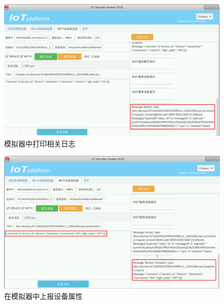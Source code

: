 \begin{figure}[!htbp]
\centering
\includegraphics[width=\textwidth]{figures/序列 01.00_25_35_10.Still025.png}
\caption{模拟器中打印相关日志}\label{模拟器中打印相关日志1}
\end{figure}

\begin{figure}[!htbp]
\centering
\includegraphics[width=\textwidth]{figures/序列 01.00_26_45_12.Still026.png}
\caption{在模拟器中上报设备属性}\label{在模拟器中上报设备属性}
\end{figure}

